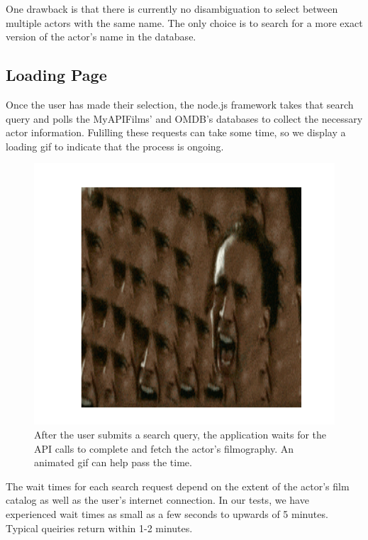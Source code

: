 \documentclass[12pt]{article}
\begin{document}
One drawback is that there is currently no disambiguation to select between multiple actors with the same name.  The only choice is to search for a more exact version of the actor's name in the database.

\subsection{Loading Page}

Once the user has made their selection, the node.js framework takes that search query and polls the MyAPIFilms' and OMDB's databases to collect the necessary actor information.  Fulilling these requests can take some time, so we display a loading gif to indicate that the process is ongoing.

			\begin{figure}[h!]
				\centering
				\includegraphics[scale=0.3]{images/loadingPage.png}
				\caption{After the user submits a search query, the application waits for the API calls to complete and fetch the actor's filmography. An animated gif can help pass the time.}
			\end{figure}

The wait times for each search request depend on the extent of the actor's film catalog as well as the user's internet connection.  In our tests, we have experienced wait times as small as a few seconds to upwards of 5 minutes. Typical queiries return within 1-2 minutes.

\newpage 
\end{document}
